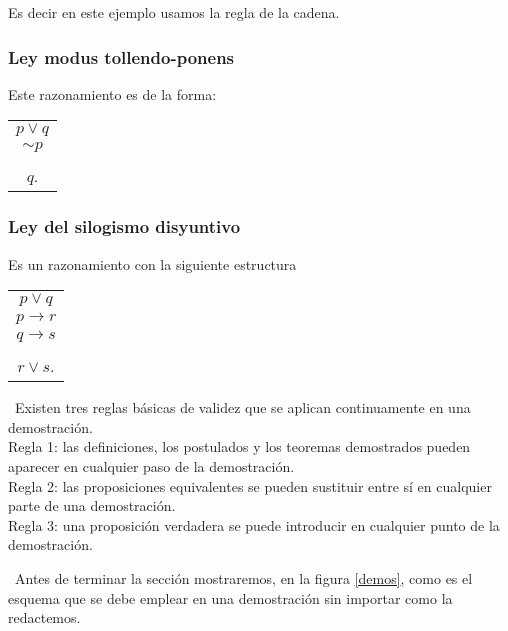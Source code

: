 Es decir en este ejemplo usamos la regla de la cadena.


\subsubsection{Ley modus tollendo-ponens }

Este razonamiento es de la forma: 

\begin{center}
\begin{tabular}{c}
$p\vee q$\tabularnewline
$\sim p$\tabularnewline
\hline\tabularnewline
$q$.\tabularnewline
\end{tabular}
\par\end{center}


\subsubsection{Ley del silogismo disyuntivo}

Es un razonamiento con la siguiente estructura 

\begin{center}
\begin{tabular}{c}
$p\vee q$\tabularnewline
$p\longrightarrow r$\tabularnewline
$q\longrightarrow s$\tabularnewline
\hline\tabularnewline
$r\vee s$.\tabularnewline
\end{tabular}
\par\end{center}

\nota\ Existen tres reglas básicas de validez que se aplican continuamente
en una demostración.\\
 Regla 1: las definiciones, los postulados y los teoremas demostrados
pueden aparecer en cualquier paso de la demostración.\\
 Regla 2: las proposiciones equivalentes se pueden sustituir entre
sí en cualquier parte de una demostración.\\
 Regla 3: una proposición verdadera se puede introducir en cualquier
punto de la demostración.

\vspace{20pt}
 \nota\ Antes de terminar la sección mostraremos, en la figura \ref{demos},
como es el esquema que se debe emplear en una demostración sin importar
como la redactemos. 

